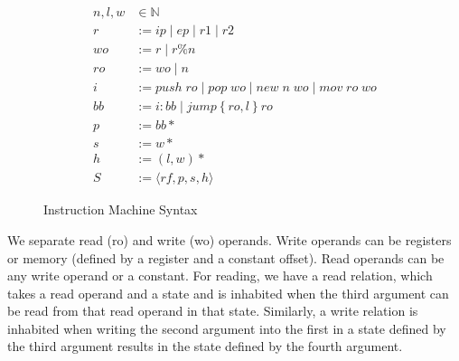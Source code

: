 \begin{figure}
\begin{align}
n, l, w &\in \mathbb{N} \tag{Machine Word} \\
r &:= ip \; | \; ep \; | \; r1 \; | \; r2 \tag{Registers} \\
wo &:= r \; | \; r \% n \tag{Write Operands} \\
ro &:= wo \; | \; n \tag{Read Operands} \\
i &:= push \; ro \; | \; pop \; wo \; | \; new \; n \; wo \; | \; mov \; ro \; wo \tag{Instructions} \\
bb &:= i : bb \; | \; jump \left\{ro, l\right\} ro \tag{Basic Block} \\
p &:= bb* \tag{Program} \\
s &:= w* \tag{Stack} \\
h &:= \left(l, w\right)* \tag{Heap}\\
S &:= \langle rf, p, s, h \rangle \tag{State} 
\end{align}
\caption{Instruction Machine Syntax}
\label{fig:im_syntax}
\end{figure}

We separate read (ro) and write (wo) operands. Write operands can be registers
or memory (defined by a register and a constant offset). Read operands can be
any write operand or a constant. For reading, we have a read relation, which
takes a read operand and a state and is inhabited when the third argument can be
read from that read operand in that state. Similarly, a write relation is
inhabited when writing the second argument into the first in a state defined by
the third argument results in the state defined by the fourth argument.  

